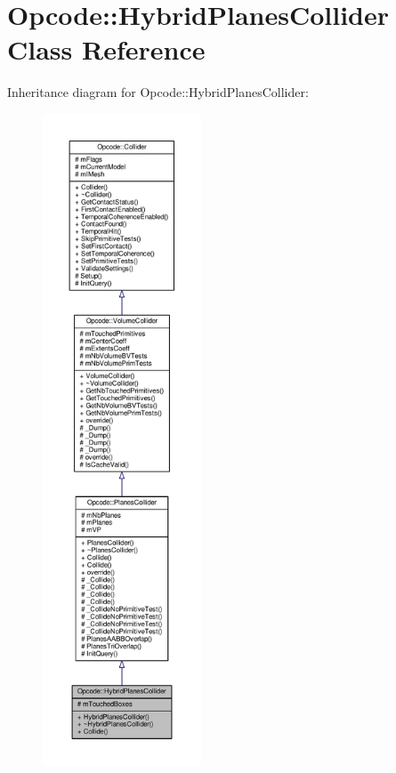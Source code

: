 \hypertarget{classOpcode_1_1HybridPlanesCollider}{}\section{Opcode\+:\+:Hybrid\+Planes\+Collider Class Reference}
\label{classOpcode_1_1HybridPlanesCollider}


Inheritance diagram for Opcode\+:\+:Hybrid\+Planes\+Collider\+:
\nopagebreak
\begin{figure}[H]
\begin{center}
\leavevmode
\includegraphics[height=550pt]{d4/dc7/classOpcode_1_1HybridPlanesCollider__inherit__graph}
\end{center}
\end{figure}


